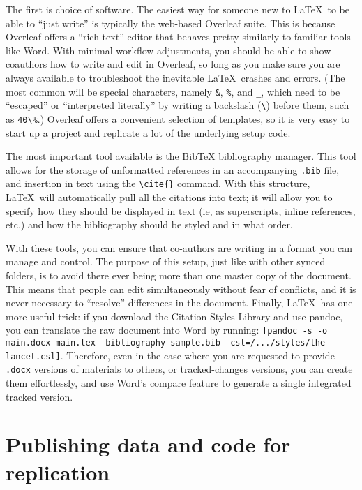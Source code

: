 The first is choice of software. The easiest way
for someone new to \LaTeX\ to be able to ``just write''
is typically the web-based Overleaf suite.
This is because Overleaf offers a ``rich text'' editor
that behaves pretty similarly to familiar tools like Word.
With minimal workflow adjustments, you should be able
to show coauthors how to write and edit in Overleaf,
so long as you make sure you are always available to troubleshoot
the inevitable \LaTeX\ crashes and errors.
(The most common will be special characters, namely
\texttt{\&}, \texttt{\%}, and \texttt{\_},
which need to be ``escaped'' or ``interpreted literally''
by writing a backslash (\texttt{\textbackslash}) before them,
such as  \texttt{40\textbackslash\%}.)
Overleaf offers a convenient selection of templates,
so it is very easy to start up a project
and replicate a lot of the underlying setup code.

The most important tool available is the BibTeX bibliography manager.
This tool allows for the storage of unformatted references
in an accompanying \texttt{.bib} file, and insertion in text
using the \texttt{\textbackslash cite\{\}} command.
With this structure, \LaTeX\ will automatically pull
all the citations into text; it will allow you to specify
how they should be displayed in text
(ie, as superscripts, inline references, etc.)
and how the bibliography should be styled and in what order.

With these tools, you can ensure that co-authors are writing
in a format you can manage and control.
The purpose of this setup, just like with other synced folders,
is to avoid there ever being more than one master copy of the document.
This means that people can edit simultaneously without fear of conflicts,
and it is never necessary to ``resolve'' differences in the document.
Finally, \LaTeX\ has one more useful trick:
if you download the Citation Styles Library
and use pandoc,
you can translate the raw document into Word by running:
\texttt{[pandoc -s -o main.docx main.tex --bibliography sample.bib --csl=/.../styles/the-lancet.csl]}.
Therefore, even in the case where you are requested to provide
\texttt{.docx} versions of materials to others, or tracked-changes versions,
you can create them effortlessly,
and use Word's compare feature to generate a single integrated tracked version.


\section{Publishing data and code for replication}
